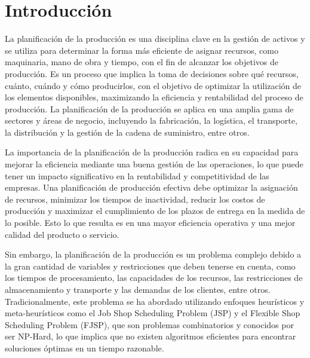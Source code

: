 \section{Introducción}
La planificación de la producción es una disciplina clave en la gestión de 
activos y se utiliza para determinar la forma más eficiente de asignar 
recursos, como maquinaria, mano de obra y tiempo, con el fin de alcanzar 
los objetivos de producción. Es un proceso que implica la toma de decisiones 
sobre qué recursos, cuánto, cuándo y cómo producirlos, con el objetivo de optimizar la 
utilización de los elementos disponibles, maximizando la eficiencia y rentabilidad 
del proceso de producción. La planificación de la producción se aplica en una 
amplia gama de sectores y áreas de negocio, incluyendo la fabricación, la logística, 
el transporte, la distribución y la gestión de la cadena de suministro, entre otros.\medskip

La importancia de la planificación de la producción radica en su capacidad para mejorar 
la eficiencia mediante una buena gestión de las operaciones, lo que puede tener un impacto 
significativo en la rentabilidad y competitividad de las empresas. Una planificación de 
producción efectiva debe optimizar la asignación de recursos, minimizar los tiempos de 
inactividad, reducir los costos de producción y maximizar el cumplimiento de los plazos 
de entrega en la medida de lo posible. Esto lo que resulta es en una mayor eficiencia operativa 
y una mejor calidad del producto o servicio.\medskip

Sin embargo, la planificación de la producción es un problema complejo debido a la gran 
cantidad de variables y restricciones que deben tenerse en cuenta, como los tiempos de 
procesamiento, las capacidades de los recursos, las restricciones de almacenamiento y 
transporte y las demandas de los clientes, entre otros. Tradicionalmente, este problema 
se ha abordado utilizando enfoques heurísticos y meta-heurísticos como el 
Job Shop Scheduling Problem (JSP) y el Flexible Shop Scheduling Problem (FJSP), que son problemas 
combinatorios y conocidos por ser NP-Hard, lo que implica que no existen algoritmos eficientes 
para encontrar soluciones óptimas en un tiempo razonable.\medskip

